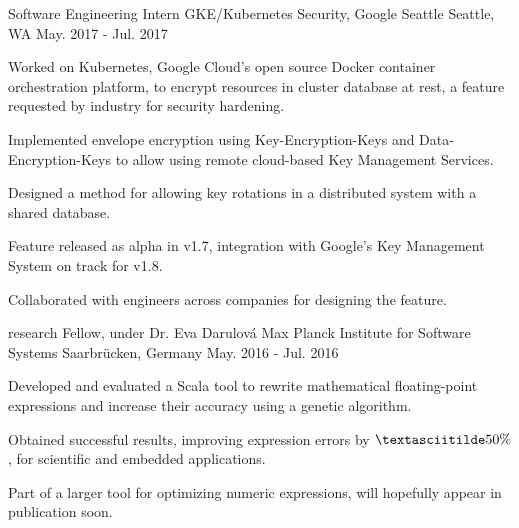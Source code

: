 
\vspace{-0.2cm}


\begin{cventries}


  \cventry
  {Software Engineering Intern}
  {GKE/Kubernetes Security, Google Seattle}
  {Seattle, WA}
  {May. 2017 - Jul. 2017}
  {
    \begin{cvitems}
    \item {Worked on Kubernetes, Google Cloud's open source Docker container orchestration platform, to encrypt resources in cluster database at rest, a feature requested by industry for security hardening.}
    \item {Implemented envelope encryption using Key-Encryption-Keys and Data-Encryption-Keys to allow using remote cloud-based Key Management Services.}
    \item {Designed a method for allowing key rotations in a distributed system with a shared database.}
    \item {Feature released as alpha in v1.7, integration with Google's Key Management System on track for v1.8.}
    \item {Collaborated with engineers across companies for designing the feature.}
    \end{cvitems}
  }

  \cventry
  {research Fellow, under Dr. Eva Darulová} %
  {Max Planck Institute for Software Systems} %
  {Saarbrücken, Germany} %
  {May. 2016 - Jul. 2016} %
  {
    \begin{cvitems}
    \item {Developed and evaluated a Scala tool to rewrite
    mathematical floating-point expressions and increase their
    accuracy using a genetic algorithm.}
    \item {Obtained successful results, improving expression errors by
    $\textasciitilde50\%$, for scientific and embedded
    applications.}
    \item {Part of a larger tool for optimizing numeric expressions,
        will hopefully appear in publication soon.}
    \end{cvitems}
  }


\end{cventries}
